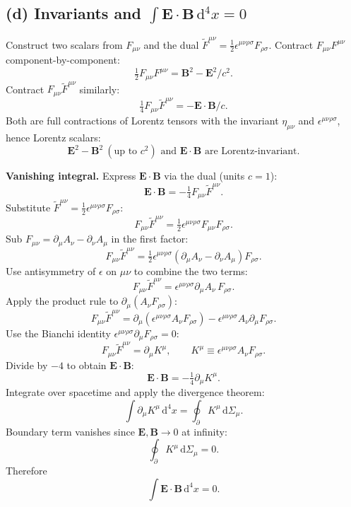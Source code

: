 \documentclass[11pt]{article}
\newcommand{\de}{\mathrm{d}}
\begin{document}
\subsection*{(d) Invariants and $\int\bm E\cdot\bm B\,\de^4 x = 0$}

Construct two scalars from $F_{\mu\nu}$ and the dual $\tilde F^{\mu\nu}=\tfrac12\epsilon^{\mu\nu\rho\sigma}F_{\rho\sigma}$. Contract $F_{\mu\nu}F^{\mu\nu}$ component-by-component:
\[ \tfrac12 F_{\mu\nu}F^{\mu\nu} = \bm B^2 - \bm E^2/c^2. \]
Contract $F_{\mu\nu}\tilde F^{\mu\nu}$ similarly:
\[ \tfrac14 F_{\mu\nu}\tilde F^{\mu\nu} = -\bm E\cdot\bm B/c. \]
Both are full contractions of Lorentz tensors with the invariant $\eta_{\mu\nu}$ and $\epsilon^{\mu\nu\rho\sigma}$, hence Lorentz scalars:
\begin{equation}
\boxed{\bm E^2-\bm B^2\ (\text{up to }c^2)\text{ and }\bm E\cdot\bm B\text{ are Lorentz-invariant.}}
\end{equation}

\textbf{Vanishing integral.} Express $\bm E\cdot\bm B$ via the dual (units $c=1$):
\[ \bm E\cdot\bm B = -\tfrac14 F_{\mu\nu}\tilde F^{\mu\nu}. \]
Substitute $\tilde F^{\mu\nu}=\tfrac12\epsilon^{\mu\nu\rho\sigma}F_{\rho\sigma}$:
\[ F_{\mu\nu}\tilde F^{\mu\nu} = \tfrac12\epsilon^{\mu\nu\rho\sigma}F_{\mu\nu}F_{\rho\sigma}. \]
Sub $F_{\mu\nu}=\partial_\mu A_\nu-\partial_\nu A_\mu$ in the first factor:
\[ F_{\mu\nu}\tilde F^{\mu\nu} = \tfrac12\epsilon^{\mu\nu\rho\sigma}(\partial_\mu A_\nu - \partial_\nu A_\mu)F_{\rho\sigma}. \]
Use antisymmetry of $\epsilon$ on $\mu\nu$ to combine the two terms:
\[ F_{\mu\nu}\tilde F^{\mu\nu} = \epsilon^{\mu\nu\rho\sigma}\partial_\mu A_\nu\,F_{\rho\sigma}. \]
Apply the product rule to $\partial_\mu(A_\nu F_{\rho\sigma})$:
\[ F_{\mu\nu}\tilde F^{\mu\nu} = \partial_\mu(\epsilon^{\mu\nu\rho\sigma}A_\nu F_{\rho\sigma}) - \epsilon^{\mu\nu\rho\sigma}A_\nu\partial_\mu F_{\rho\sigma}. \]
Use the Bianchi identity $\epsilon^{\mu\nu\rho\sigma}\partial_\mu F_{\rho\sigma}=0$:
\[ F_{\mu\nu}\tilde F^{\mu\nu} = \partial_\mu K^\mu,\qquad K^\mu \equiv \epsilon^{\mu\nu\rho\sigma}A_\nu F_{\rho\sigma}. \]
Divide by $-4$ to obtain $\bm E\cdot\bm B$:
\[ \bm E\cdot\bm B = -\tfrac14\partial_\mu K^\mu. \]
Integrate over spacetime and apply the divergence theorem:
\[ \int\partial_\mu K^\mu\,\de^4 x = \oint_{\partial}K^\mu\,\de\Sigma_\mu. \]
Boundary term vanishes since $\bm E,\bm B\to 0$ at infinity:
\[ \oint_{\partial}K^\mu\,\de\Sigma_\mu = 0. \]
Therefore
\begin{equation}
\boxed{\int\bm E\cdot\bm B\,\de^4 x = 0.}
\end{equation}
\end{document}
